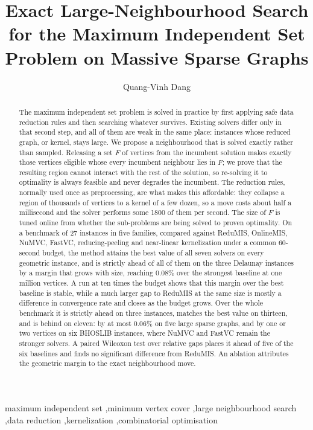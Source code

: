 \documentclass[preprint,12pt]{elsarticle}
\theoremstyle{definition}
\begin{document}
\begin{frontmatter}

\title{Exact Large-Neighbourhood Search for the Maximum Independent Set
       Problem on Massive Sparse Graphs}

\author[buv]{Quang-Vinh Dang}

\begin{abstract}
The maximum independent set problem is solved in practice by first applying
safe data reduction rules and then searching whatever survives. Existing
solvers differ only in that second step, and all of them are weak in the same
place: instances whose reduced graph, or kernel, stays large. We propose a
neighbourhood that is solved exactly rather than sampled. Releasing a set $F$
of vertices from the incumbent solution makes exactly those vertices eligible
whose every incumbent neighbour lies in $F$; we prove that the resulting region
cannot interact with the rest of the solution, so re-solving it to optimality is
always feasible and never degrades the incumbent. The reduction rules, normally
used once as preprocessing, are what makes this affordable: they collapse a
region of thousands of vertices to a kernel of a few dozen, so a move costs
about half a millisecond and the solver performs some 1800 of them per second.
The size of $F$ is tuned online from whether the sub-problems are
being solved to proven optimality. On a benchmark of 27 instances in five
families, compared against ReduMIS, OnlineMIS, NuMVC, FastVC, reducing-peeling
and near-linear kernelization under a common 60-second budget, the method
attains the best value of all seven solvers on every geometric instance, and is
strictly ahead of all of them on the three Delaunay instances by a margin that
grows with size, reaching $0.08\%$ over the strongest baseline at one million
vertices. A run at ten times the budget shows that this margin over the best
baseline is stable, while a much larger gap to ReduMIS at the same size is
mostly a difference in convergence rate and closes as the budget grows. Over the whole benchmark it is strictly ahead
on three instances, matches the best value on thirteen, and is behind on
eleven: by at most $0.06\%$ on five large sparse graphs, and by one or two
vertices on six BHOSLIB instances, where NuMVC and FastVC remain the stronger
solvers. A paired
Wilcoxon test over relative gaps places it ahead of five of the six baselines
and finds no significant difference from ReduMIS. An ablation attributes the
geometric margin to the exact neighbourhood move.
\end{abstract}

\begin{keyword}
maximum independent set \sep minimum vertex cover \sep large neighbourhood
search \sep data reduction \sep kernelization \sep combinatorial optimisation
\end{keyword}

\end{frontmatter}
\end{document}
